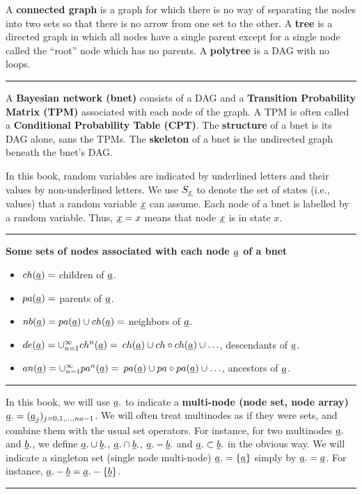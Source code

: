 A {\bf connected graph}
is a graph for which there
is no way of separating
the nodes into
two sets so that there is no arrow
from one set to the other.
A {\bf tree}
is a directed graph
in which all nodes
have a single parent
except for a single
node called the \enquote{root} node
which has no parents.
A {\bf polytree}
is a DAG with
no loops.





\hrule

A {\bf Bayesian network (bnet)}
consists of a DAG
and a
{\bf Transition
Probability Matrix (TPM)}
associated
with each node
of the graph.
A TPM is often
called a {\bf Conditional Probability
Table
(CPT)}.
The {\bf structure} of a bnet
is its DAG alone, sans the TPMs.
The
{\bf skeleton} of a bnet is the
undirected graph beneath the bnet's
DAG.



In
this book,
random  variables are
 indicated by
underlined letters and their values
by non-underlined letters.
We use $S_{\underline{x}}$
to denote the set of states (i.e., values)
that a random variable ${\underline{x}}$ can assume.
 Each node of a bnet is
 labelled by a random variable.
 Thus, ${\underline{x}}=x$ means that node
${\underline{x}}$ is in state $x$.

\hrule\noindent
{\bf Some sets of nodes
associated
with each node ${\underline{a}}$
of a bnet}
\begin{itemize}
\item
$ch({\underline{a}})=$ children of ${\underline{a}}$.
\item
$pa({\underline{a}})=$ parents of ${\underline{a}}$.
\item
$nb({\underline{a}})=pa({\underline{a}})\cup ch({\underline{a}})=$
neighbors of ${\underline{a}}$.
\item
$de({\underline{a}})=\cup_{n=1}^{\infty}ch^n({\underline{a}})=$
$ch({\underline{a}})\cup ch\circ ch({\underline{a}})\cup\ldots$,
descendants of ${\underline{a}}$.
\item
$an({\underline{a}})=\cup_{n=1}^{\infty}pa^n({\underline{a}})=$
$pa({\underline{a}})\cup pa\circ pa({\underline{a}})\cup\ldots$,
ancestors of ${\underline{a}}$.
\end{itemize}
\hrule
In this book,
we will use
${\underline{a}}.$
to indicate
a {\bf multi-node (node set,
node array)} ${\underline{a}}.=
({\underline{a}}_j)_{j=0, 1, \ldots , na-1}$.
We will often
treat multinodes as if
they were sets, and
combine them with
the usual
set
operators.
For instance,
for two
multinodes ${\underline{a}}.$
and ${\underline{b}}.$,
we define
${\underline{a}}.\cup{\underline{b}}.$,
${\underline{a}}.\cap{\underline{b}}.$,
${\underline{a}}.-{\underline{b}}.$
and
${\underline{a}}.\subset{\underline{b}}.$
in the obvious way.
We
will indicate
a singleton set (single
node multi-node) ${\underline{a}}.=\{{\underline{a}}\}$
simply by ${\underline{a}}.={\underline{a}}$.
For instance,
${\underline{a}}.-{\underline{b}}={\underline{a}}.-\{{\underline{b}}\}$.
\hrule

